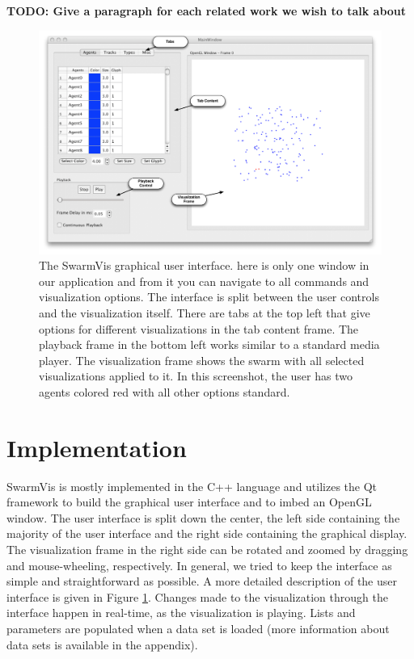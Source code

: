 \documentclass[conference]{IEEEtran}
\begin{document}
\textbf{TODO: Give a paragraph for each related work we wish to talk about}

\begin{figure}[ht]
\centering
\includegraphics[scale=.45]{images/swarmvis-annotated.pdf}
\caption{The SwarmVis graphical user interface. 
here is only one window in our application and from it you can navigate to all commands and visualization options.
The interface is split between the user controls and the visualization itself. There are tabs at the top left that give
options for different visualizations in the tab content frame. The playback frame in the bottom left works similar to a
standard media player. The visualization frame shows the swarm with all selected visualizations applied to it. In this
screenshot, the user has two agents colored red with all other options standard. }
\label{AnnotatedWindow}
\end{figure}

\section{Implementation}
SwarmVis is mostly  implemented in the C++ language and utilizes the Qt framework\cite{Qt:website}
to build the graphical user interface and to imbed an OpenGL window.
The user interface is split down the center,
the left side containing the majority of the user interface and the right side containing the graphical display.
The visualization frame in the right side can be rotated and zoomed by dragging and mouse-wheeling, respectively.
In general, we tried to keep the interface as simple and straightforward as possible.
A more detailed description of the user interface is given in Figure \ref{AnnotatedWindow}.
Changes made to the visualization through the interface happen in real-time, as the visualization is playing.
Lists and parameters are populated when a data set is loaded (more information about data sets is available in the appendix).
\end{document}
